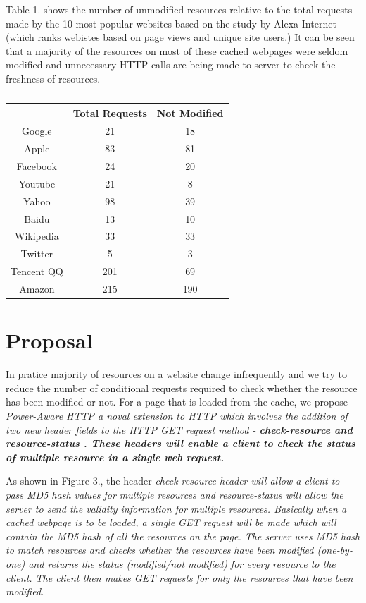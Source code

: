 \documentclass{sigplanconf}
\begin{document}
Table 1. shows the number of unmodified resources relative to the total requests made by the 10 most popular websites based on the study by Alexa Internet (which ranks webistes based on page views and unique site users.)
It can be seen that a majority of the resources on most of these cached webpages were seldom modified and unnecessary HTTP calls are being made to server to check the freshness of resources.

\begin{table}[htbp]
\centering
\caption{}
\begin{tabular}{|c|c|c|}
\hline
 & \multicolumn{1}{l|}{Total Requests} & \multicolumn{1}{l|}{Not Modified} \\ \hline
Google & 21 & 18 \\ \hline
Apple & 83 & 81 \\ \hline
Facebook & 24 & 20 \\ \hline
Youtube & 21 & 8 \\ \hline
Yahoo & 98 & 39 \\ \hline
Baidu & 13 & 10 \\ \hline
Wikipedia & 33 & 33 \\ \hline
Twitter & 5 & 3 \\ \hline
Tencent QQ & 201 & 69 \\ \hline
Amazon & 215 & 190 \\ \hline
\end{tabular}
\label{}
\end{table}

\section{Proposal}

In pratice majority of resources on a website change infrequently and we try to reduce the number of conditional requests required to check whether the resource has been modified or not. For a page that is loaded from the cache, we propose \it{Power-Aware HTTP} \rm  a noval extension to HTTP which involves the addition of two new header fields to the HTTP GET request method - \bf{check-resource} \rm and \bf{resource-status} \rm. These headers will enable a client to check the status of multiple resource in a single web request.  

As shown in Figure 3., the header \it{check-resource} \rm header will allow a client to pass MD5 hash values for multiple resources and \it{resource-status} \rm will allow the server to send the validity information for multiple resources. Basically when a cached webpage is to be loaded, a single GET request will be made which will contain the MD5 hash of all the resources on the page. The server uses MD5 hash to match resources and checks whether the resources have been modified (one-by-one) and returns the status (modified/not modified) for every resource to the client. The client then makes GET requests for only the resources that have been modified.
\end{document}
